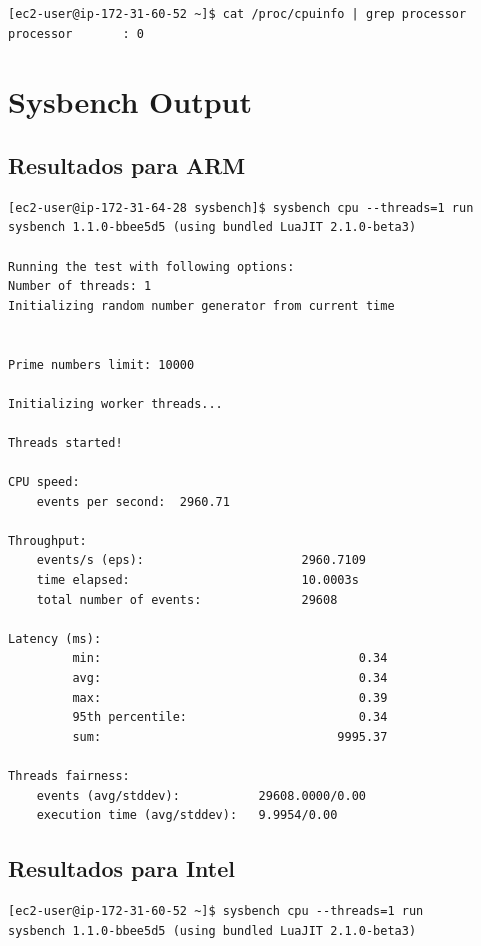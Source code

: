 \documentclass[a4paper,openright,12pt]{article}
\begin{document}
\begin{appendices}
\begin{verbatim}
[ec2-user@ip-172-31-60-52 ~]$ cat /proc/cpuinfo | grep processor
processor       : 0
\end{verbatim}

\newpage
\section{Sysbench Output}\label{anexo:sysbench_output}
\subsection{Resultados para ARM}
\begin{verbatim}
[ec2-user@ip-172-31-64-28 sysbench]$ sysbench cpu --threads=1 run
sysbench 1.1.0-bbee5d5 (using bundled LuaJIT 2.1.0-beta3)

Running the test with following options:
Number of threads: 1
Initializing random number generator from current time


Prime numbers limit: 10000

Initializing worker threads...

Threads started!

CPU speed:
    events per second:  2960.71

Throughput:
    events/s (eps):                      2960.7109
    time elapsed:                        10.0003s
    total number of events:              29608

Latency (ms):
         min:                                    0.34
         avg:                                    0.34
         max:                                    0.39
         95th percentile:                        0.34
         sum:                                 9995.37

Threads fairness:
    events (avg/stddev):           29608.0000/0.00
    execution time (avg/stddev):   9.9954/0.00
\end{verbatim}
\newpage
\subsection{Resultados para Intel}
\begin{verbatim}
[ec2-user@ip-172-31-60-52 ~]$ sysbench cpu --threads=1 run
sysbench 1.1.0-bbee5d5 (using bundled LuaJIT 2.1.0-beta3)


\end{verbatim}
\end{appendices}
\end{document}
